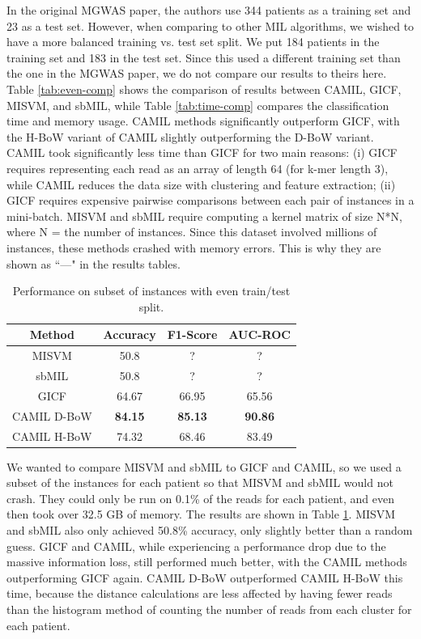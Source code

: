 In the original MGWAS paper, the authors use 344 patients as a training set and 23 as a test set. However, when comparing to other MIL algorithms, we wished to have a more balanced training vs. test set split. We put 184 patients in the training set and 183 in the test set. Since this used a different training set than the one in the MGWAS paper, we do not compare our results to theirs here. Table \ref{tab:even-comp} shows the comparison of results between CAMIL, GICF, MISVM, and sbMIL, while Table \ref{tab:time-comp} compares the classification time and memory usage. CAMIL methods significantly outperform GICF, with the H-BoW variant of CAMIL slightly outperforming the D-BoW variant. CAMIL took significantly less time than GICF for two main reasons: (i) GICF requires representing each read as an array of length 64 (for k-mer length 3), while CAMIL reduces the data size with clustering and feature extraction; (ii) GICF requires expensive pairwise comparisons between each pair of instances in a mini-batch. MISVM and sbMIL require computing a kernel matrix of size N*N, where N = the number of instances. Since this dataset involved millions of instances, these methods crashed with memory errors. This is why they are shown as ``---" in the results tables.

\begin{table}[h]
\begin{center}
\caption{Performance on subset of instances with even train/test split.}
\label{tab:subset-comp}
\begin{tabular}{|c|ccc|}\hline
Method & Accuracy & F1-Score & AUC-ROC\\\hline
MISVM & 50.8 & ? & ?\\\hline
sbMIL & 50.8 & ? & ?\\\hline
GICF & 64.67 & 66.95 & 65.56\\\hline
CAMIL D-BoW & \bf{84.15} & \bf{85.13} & \bf{90.86}\\\hline
CAMIL H-BoW & 74.32 & 68.46 & 83.49\\\hline
\end{tabular}
\end{center}
\end{table}

We wanted to compare MISVM and sbMIL to GICF and CAMIL, so we used a subset of the instances for each patient so that MISVM and sbMIL would not crash. They could only be run on 0.1\% of the reads for each patient, and even then took over 32.5 GB of memory. The results are shown in Table \ref{tab:subset-comp}. MISVM and sbMIL also only achieved 50.8\% accuracy, only slightly better than a random guess. GICF and CAMIL, while experiencing a performance drop due to the massive information loss, still performed much better, with the CAMIL methods outperforming GICF again. CAMIL D-BoW outperformed CAMIL H-BoW this time, because the distance calculations are less affected by having fewer reads than the histogram method of counting the number of reads from each cluster for each patient.

